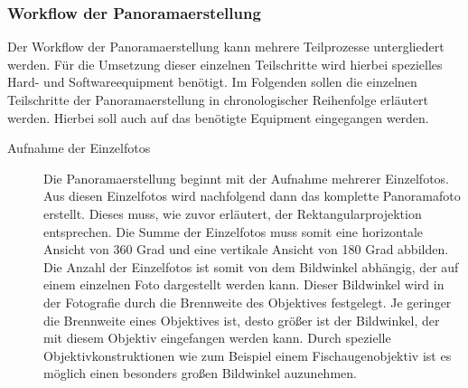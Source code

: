 \subsubsection{Workflow der Panoramaerstellung}
\label{sec:Workflow}

Der Workflow der Panoramaerstellung kann mehrere Teilprozesse untergliedert
werden. Für die Umsetzung dieser einzelnen Teilschritte wird hierbei spezielles
Hard- und Softwareequipment benötigt. Im Folgenden sollen die einzelnen
Teilschritte der Panoramaerstellung in chronologischer Reihenfolge erläutert
werden. Hierbei soll auch auf das benötigte Equipment eingegangen werden.

\begin{description}
\item[Aufnahme der Einzelfotos] Die Panoramaerstellung beginnt mit der Aufnahme
mehrerer Einzelfotos. Aus diesen Einzelfotos wird nachfolgend dann das komplette
Panoramafoto erstellt. Dieses muss, wie zuvor erläutert, der
Rektangularprojektion entsprechen. Die Summe der Einzelfotos muss somit eine
horizontale Ansicht von 360 Grad und eine vertikale Ansicht von 180 Grad
abbilden. Die Anzahl der Einzelfotos ist somit von dem Bildwinkel abhängig, der
auf einem einzelnen Foto dargestellt werden kann. Dieser Bildwinkel wird in der
Fotografie durch die Brennweite des Objektives festgelegt. Je geringer die
Brennweite eines Objektives ist, desto größer ist der Bildwinkel, der mit diesem
Objektiv eingefangen werden kann. Durch spezielle Objektivkonstruktionen wie zum
Beispiel einem Fischaugenobjektiv ist es möglich einen besonders großen
Bildwinkel auzunehmen. 
\end{description}
